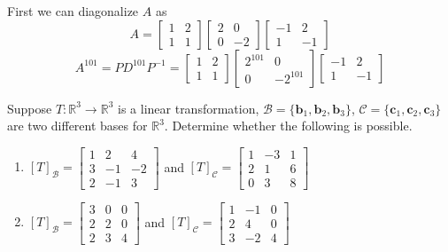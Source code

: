 \documentclass[a4paper,10pt]{article}
\begin{document}
\begin{solution}
First we can diagonalize $A$ as
\[
A=\begin{bmatrix}
1&2\\
1&1
\end{bmatrix}\begin{bmatrix}
2&0\\
0&-2
\end{bmatrix}\begin{bmatrix}
-1&2\\
1&-1
\end{bmatrix}
\]
\[
A^{101}=PD^{101}P^{-1}=\begin{bmatrix}
1&2\\
1&1
\end{bmatrix}\begin{bmatrix}
2^{101}&0\\
0&-2^{101}
\end{bmatrix}\begin{bmatrix}
-1&2\\
1&-1
\end{bmatrix}
\]
\end{solution}

\begin{problem}
Suppose $T:\mathbb R^3\to\mathbb R^3$ is a linear transformation, $\mathcal B=\{\mathbf b_1,\mathbf b_2,\mathbf b_3\}$, $\mathcal C=\{\mathbf c_1,\mathbf c_2,\mathbf c_3\}$ are two different bases for $\mathbb R^3$. Determine whether the following is possible.
\begin{enumerate}[label=\alph*)]
\item $[T]_{\mathcal B}=\begin{bmatrix}
1 &2&4\\
3 &-1 &-2\\
2 &-1& 3
\end{bmatrix}$ and $[T]_{\mathcal C}=\begin{bmatrix}
1& -3 &1\\
2 &1& 6\\
0 &3 &8
\end{bmatrix}$
\item $[T]_{\mathcal B}=\begin{bmatrix}
3&0&0\\
2&2&0\\
2&3&4
\end{bmatrix}$ and $[T]_{\mathcal C}=\begin{bmatrix}
1&-1&0\\
2&4&0\\
3&-2&4
\end{bmatrix}$
\end{enumerate}
\end{problem}
\end{document}
